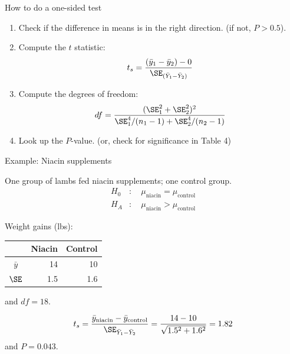 \begin{frame}{How to do a one-sided test}

  \begin{center}
  \end{center}

  \vspace{-1em}

  \begin{enumerate}
    \item Check if the difference in means is in the right direction. (if not, $P>0.5$).

    \item Compute the $t$ statistic:
      \[
          t_s = \frac{ (\bar y_1 - \bar y_2) - 0}{ \SE_{(\bar Y_1 - \bar Y_2)} }
      \]

    \item Compute the degrees of freedom:
        \[
            df = \frac{ (\SE_1^2 + \SE_2^2)^2 }{ \SE_1^4 / (n_1-1) + \SE_2^4 / (n_2 - 1) }
        \]

    \item Look up the $P$-value. (or, check for significance in Table 4)

  \end{enumerate}


\end{frame}

\begin{frame}{Example: Niacin supplements}

  One group of lambs fed niacin supplements; one control group.  
  \begin{align*}
    H_0 &: \quad \mu_\text{niacin} = \mu_\text{control}  \\
    H_A &: \quad \mu_\text{niacin} > \mu_\text{control}  
  \end{align*}


    \vspace{2em}

  
  Weight gains (lbs):
    \begin{center}
      \begin{tabular}{c|rr}
            & Niacin & Control \\
          \hline
          $\bar y$ & 14 & 10 \\
          $\SE$ & 1.5 & 1.6 \\
     \end{tabular}
   \end{center}
   and $df = 18$.


    \vspace{2em}
    \pause

    \[
    t_s = \frac{ \bar y_\text{niacin} - \bar y_\text{control} }{ \SE_{\bar Y_1 - \bar Y_2} } = \frac{ 14 - 10 }{ \sqrt{ 1.5^2 + 1.6^2 } } = 1.82
    \]
    and $P = 0.043$.
    \pause

\end{frame}


